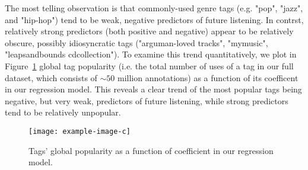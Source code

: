 The most telling observation is that commonly-used genre tags (e.g. "pop", "jazz", and "hip-hop") tend to be weak, negative predictors of future listening. In contrst, relatively strong predictors (both positive and negative) appear to be relatively obscure, possibly idiosyncratic tags ("arguman-loved tracks", "mymusic", "leapsandbounds cdcollection"). To examine this trend quantitatively, we plot in Figure~\ref{fig:coefVsPopularity} global tag popularity (i.e. the total number of uses of a tag in our full dataset, which consists of $\sim 50$ million annotations) as a function of its coefficent in our regression model. This reveals a clear trend of the most popular tags being negative, but very weak, predictors of future listening, while strong predictors tend to be relatively unpopular.

  \begin{figure}
	\centering
      \texttt{[image: example-image-c]}
    \caption{Tags' global popularity as a function of coefficient in our regression model.}
    \label{fig:coefVsPopularity}
  \end{figure} 

